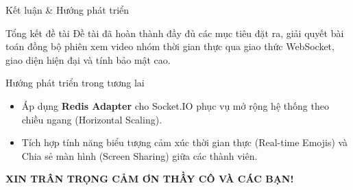 \documentclass[aspectratio=169,11pt]{beamer}
\begin{document}
\begin{frame}{Kết luận \& Hướng phát triển}
    \begin{block}{Tổng kết đề tài}
        Đề tài đã hoàn thành đầy đủ các mục tiêu đặt ra, giải quyết bài toán đồng bộ phiên xem video nhóm thời gian thực qua giao thức WebSocket, giao diện hiện đại và tính bảo mật cao.
    \end{block}
    
    \vspace{0.3cm}
    \begin{block}{Hướng phát triển trong tương lai}
        \begin{itemize}
            \item Áp dụng \textbf{Redis Adapter} cho Socket.IO phục vụ mở rộng hệ thống theo chiều ngang (Horizontal Scaling).
            \item Tích hợp tính năng biểu tượng cảm xúc thời gian thực (Real-time Emojis) và Chia sẻ màn hình (Screen Sharing) giữa các thành viên.
        \end{itemize}
    \end{block}
    
    \vspace{0.3cm}
    \begin{center}
        \Large \textbf{\textcolor{primary}{XIN TRÂN TRỌNG CẢM ƠN THẦY CÔ VÀ CÁC BẠN!}}
    \end{center}
\end{frame}
\end{document}
